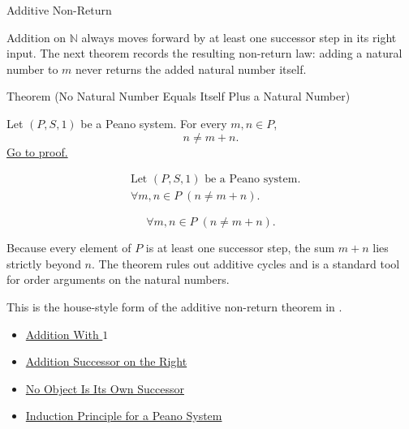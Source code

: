 \begin{topicbox}{Additive Non-Return}
\begin{exposition}
Addition on $\mathbb{N}$ always moves forward by at least one successor step
in its right input. The next theorem records the resulting non-return law:
adding a natural number to $m$ never returns the added natural number itself.
\end{exposition}

\begin{theorembox}{Theorem (No Natural Number Equals Itself Plus a Natural Number)}
\begin{theorem}
\label{thm:no-natural-number-equals-itself-plus-a-natural-number}
Let $(P,S,1)$ be a Peano system. For every $m,n \in P$,
\[
n \neq m+n.
\]
\hyperref[prf:no-natural-number-equals-itself-plus-a-natural-number]{Go to proof.}
\end{theorem}
\end{theorembox}

\begin{remark*}
\[
\begin{aligned}
&\text{Let } (P,S,1) \text{ be a Peano system.}\\
&\forall m,n \in P\;(n \neq m+n).
\end{aligned}
\]
\end{remark*}

\begin{remark*}
\[
\forall m,n \in P\;(n \neq m+n).
\]
\end{remark*}

\begin{remark*}[Interpretation]
Because every element of $P$ is at least one successor step, the sum $m+n$
lies strictly beyond $n$. The theorem rules out additive cycles and is a
standard tool for order arguments on the natural numbers.


This is the house-style form of the additive non-return theorem in
\citep{FefermanNumberSystems1964}.
\end{remark*}

\begin{dependencies}
\begin{itemize}
  \item \hyperref[thm:addition-with-one]{Addition With $1$}
  \item \hyperref[thm:addition-successor-on-right]{Addition Successor on the Right}
  \item \hyperref[thm:no-object-is-its-own-successor]{No Object Is Its Own Successor}
  \item \hyperref[thm:induction-principle-for-peano-system]{Induction Principle for a Peano System}
\end{itemize}
\end{dependencies}
\end{topicbox}
